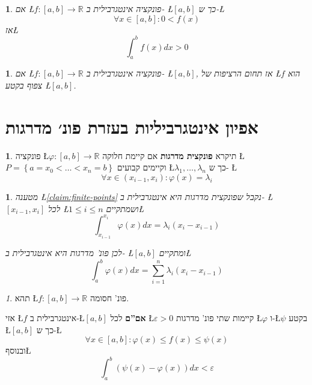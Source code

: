 \documentclass[english,hebrew]{article}
\theoremstyle{remark}
\theoremstyle{definition}
\newtheorem*{defn*}{\protect\definitionname}
\theoremstyle{plain}
\theoremstyle{remark}
\newtheorem{claim}[thm]{\protect\claimname}
\theoremstyle{plain}
\newtheorem{cor}[thm]{\protect\corollaryname}
\theoremstyle{plain}
\newtheorem*{cor*}{\protect\corollaryname}
\theoremstyle{definition}
\theoremstyle{plain}
\providecommand{\claimname}{טענה}
\providecommand{\corollaryname}{מסקנה}
\providecommand{\definitionname}{הגדרה}
\begin{document}
\begin{cor}
אם \L{$f:\left[a,b\right]\rightarrow\mathbb{R}$} פונקציה אינטגרבילית
ב- \L{$\left[a,b\right]$} כך ש-\L{%
\[
\forall x\in\left[a,b\right]:0<f(x)
\]
}%
אז\L{%
\[
\int_{a}^{b}f\left(x\right)dx>0
\]
}%
\end{cor}

\begin{cor}
אם \L{$f:\left[a,b\right]\rightarrow\mathbb{R}$} פונקציה אינטגרבילית
ב- \L{$\left[a,b\right]$}, אז תחום הרציפות של \L{$f$} הוא צפוף בקטע
\L{$\left[a,b\right]$}.
\end{cor}

\part{אפיון אינטגרביליות בעזרת פונ׳ מדרגות}
\begin{defn*}
פונקציה \L{$\varphi:\left[a,b\right]\rightarrow\mathbb{R}$} תיקרא
\textbf{פונקצית מדרגות }אם קיימת חלוקה \L{$P=\left\{ a=x_{0}<\dots<x_{n}=b\right\} $}
וקיימים קבועים \L{$\lambda_{1},\dots,\lambda_{n}$} כך ש- \L{%
\[
\forall x\in\left(x_{i-1},x_{i}\right):\varphi\left(x\right)=\lambda_{i}
\]
}%
\end{defn*}
\begin{cor*}
מטענה\textup{ }\L{\ref{claim:finite-points}}\textup{ נקבל שפונקצית
מדרגות היא אינטגרבילית ב- \L{$\left[x_{i-1},x_{i}\right]$} לכל \L{$1\le i\le n$}
ושמתקיים\L{%
\[
\int_{x_{i-1}}^{x_{i}}\varphi\left(x\right)dx=\lambda_{i}\left(x_{i}-x_{i-1}\right)
\]
}%
}

לכן פונ' מדרגות היא אינטגרבילית ב- \L{$\left[a,b\right]$} ומתקיים\L{%
\[
\int_{a}^{b}\varphi\left(x\right)dx=\underset{i=1}{\overset{n}{\sum}}\lambda_{i}\left(x_{i}-x_{i-1}\right)
\]
}%
\end{cor*}
\begin{claim}
תהא \L{$f:\left[a,b\right]\rightarrow\mathbb{R}$} פונ' חסומה.

אזי \L{$f$} אינטגרבילית ב-\L{$\left[a,b\right]$} \textbf{אם\textquotedblright ם
}לכל \L{$\varepsilon>0$} קיימות שתי פונ' מדרגות \L{$\varphi$} ו-\L{$\psi$}
בקטע \L{$\left[a,b\right]$} כך ש-\L{%
\[
\forall x\in\left[a,b\right]:\varphi\left(x\right)\le f\left(x\right)\le\psi\left(x\right)
\]
}%
 ובנוסף\L{%
\[
\int_{a}^{b}\left(\psi\left(x\right)-\varphi\left(x\right)\right)dx<\varepsilon
\]
}%
\end{claim}
\end{document}
